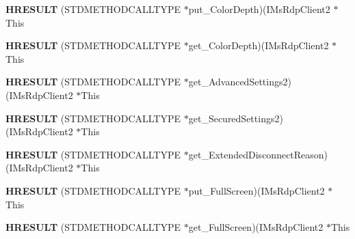 \begin{DoxyCompactItemize}
\item 
\mbox{\label{struct_i_ms_rdp_client2_vtbl_a6bb63382d0cd705f66fcdf02706605d0}} 
{\bfseries H\+R\+E\+S\+U\+LT} (S\+T\+D\+M\+E\+T\+H\+O\+D\+C\+A\+L\+L\+T\+Y\+PE $\ast$put\+\_\+\+Color\+Depth)(I\+Ms\+Rdp\+Client2 $\ast$This
\item 
\mbox{\label{struct_i_ms_rdp_client2_vtbl_ada2bf67d69d5ff58e660ea2fc9ae8a48}} 
{\bfseries H\+R\+E\+S\+U\+LT} (S\+T\+D\+M\+E\+T\+H\+O\+D\+C\+A\+L\+L\+T\+Y\+PE $\ast$get\+\_\+\+Color\+Depth)(I\+Ms\+Rdp\+Client2 $\ast$This
\item 
\mbox{\label{struct_i_ms_rdp_client2_vtbl_a21b23992ac10b135f4553281f8f9fb39}} 
{\bfseries H\+R\+E\+S\+U\+LT} (S\+T\+D\+M\+E\+T\+H\+O\+D\+C\+A\+L\+L\+T\+Y\+PE $\ast$get\+\_\+\+Advanced\+Settings2)(I\+Ms\+Rdp\+Client2 $\ast$This
\item 
\mbox{\label{struct_i_ms_rdp_client2_vtbl_a579bdde04aa8b96162ff62375a2a74b6}} 
{\bfseries H\+R\+E\+S\+U\+LT} (S\+T\+D\+M\+E\+T\+H\+O\+D\+C\+A\+L\+L\+T\+Y\+PE $\ast$get\+\_\+\+Secured\+Settings2)(I\+Ms\+Rdp\+Client2 $\ast$This
\item 
\mbox{\label{struct_i_ms_rdp_client2_vtbl_a9d12dfdd793f3d7ee528be53f8f39398}} 
{\bfseries H\+R\+E\+S\+U\+LT} (S\+T\+D\+M\+E\+T\+H\+O\+D\+C\+A\+L\+L\+T\+Y\+PE $\ast$get\+\_\+\+Extended\+Disconnect\+Reason)(I\+Ms\+Rdp\+Client2 $\ast$This
\item 
\mbox{\label{struct_i_ms_rdp_client2_vtbl_abdb55699d58389a45ea7dbe0a3e3c016}} 
{\bfseries H\+R\+E\+S\+U\+LT} (S\+T\+D\+M\+E\+T\+H\+O\+D\+C\+A\+L\+L\+T\+Y\+PE $\ast$put\+\_\+\+Full\+Screen)(I\+Ms\+Rdp\+Client2 $\ast$This
\item 
\mbox{\label{struct_i_ms_rdp_client2_vtbl_ad623a42b0f38b1e9bde54136a8decb11}} 
{\bfseries H\+R\+E\+S\+U\+LT} (S\+T\+D\+M\+E\+T\+H\+O\+D\+C\+A\+L\+L\+T\+Y\+PE $\ast$get\+\_\+\+Full\+Screen)(I\+Ms\+Rdp\+Client2 $\ast$This
\item 
\mbox{\label{struct_i_ms_rdp_client2_vtbl_abff2e7f17d793f3d0a2c7baf4be516ec}} 

\end{DoxyCompactItemize}
